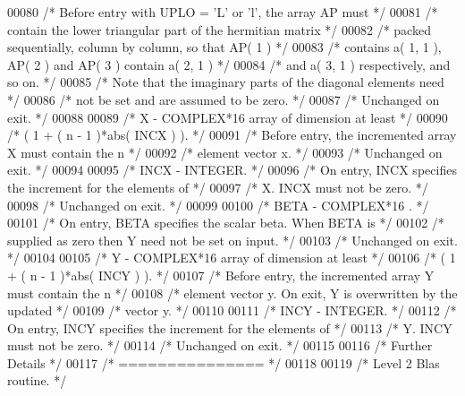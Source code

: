 \begin{DoxyCode}
00080 \textcolor{comment}{/*           Before entry with UPLO = 'L' or 'l', the array AP must */}
00081 \textcolor{comment}{/*           contain the lower triangular part of the hermitian matrix */}
00082 \textcolor{comment}{/*           packed sequentially, column by column, so that AP( 1 ) */}
00083 \textcolor{comment}{/*           contains a( 1, 1 ), AP( 2 ) and AP( 3 ) contain a( 2, 1 ) */}
00084 \textcolor{comment}{/*           and a( 3, 1 ) respectively, and so on. */}
00085 \textcolor{comment}{/*           Note that the imaginary parts of the diagonal elements need */}
00086 \textcolor{comment}{/*           not be set and are assumed to be zero. */}
00087 \textcolor{comment}{/*           Unchanged on exit. */}
00088 
00089 \textcolor{comment}{/*  X      - COMPLEX*16       array of dimension at least */}
00090 \textcolor{comment}{/*           ( 1 + ( n - 1 )*abs( INCX ) ). */}
00091 \textcolor{comment}{/*           Before entry, the incremented array X must contain the n */}
00092 \textcolor{comment}{/*           element vector x. */}
00093 \textcolor{comment}{/*           Unchanged on exit. */}
00094 
00095 \textcolor{comment}{/*  INCX   - INTEGER. */}
00096 \textcolor{comment}{/*           On entry, INCX specifies the increment for the elements of */}
00097 \textcolor{comment}{/*           X. INCX must not be zero. */}
00098 \textcolor{comment}{/*           Unchanged on exit. */}
00099 
00100 \textcolor{comment}{/*  BETA   - COMPLEX*16      . */}
00101 \textcolor{comment}{/*           On entry, BETA specifies the scalar beta. When BETA is */}
00102 \textcolor{comment}{/*           supplied as zero then Y need not be set on input. */}
00103 \textcolor{comment}{/*           Unchanged on exit. */}
00104 
00105 \textcolor{comment}{/*  Y      - COMPLEX*16       array of dimension at least */}
00106 \textcolor{comment}{/*           ( 1 + ( n - 1 )*abs( INCY ) ). */}
00107 \textcolor{comment}{/*           Before entry, the incremented array Y must contain the n */}
00108 \textcolor{comment}{/*           element vector y. On exit, Y is overwritten by the updated */}
00109 \textcolor{comment}{/*           vector y. */}
00110 
00111 \textcolor{comment}{/*  INCY   - INTEGER. */}
00112 \textcolor{comment}{/*           On entry, INCY specifies the increment for the elements of */}
00113 \textcolor{comment}{/*           Y. INCY must not be zero. */}
00114 \textcolor{comment}{/*           Unchanged on exit. */}
00115 
00116 \textcolor{comment}{/*  Further Details */}
00117 \textcolor{comment}{/*  =============== */}
00118 
00119 \textcolor{comment}{/*  Level 2 Blas routine. */}

\end{DoxyCode}
